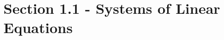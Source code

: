 \documentclass{article}
\begin{document}
\section*{Section 1.1 - Systems of Linear Equations}
\end{document}
